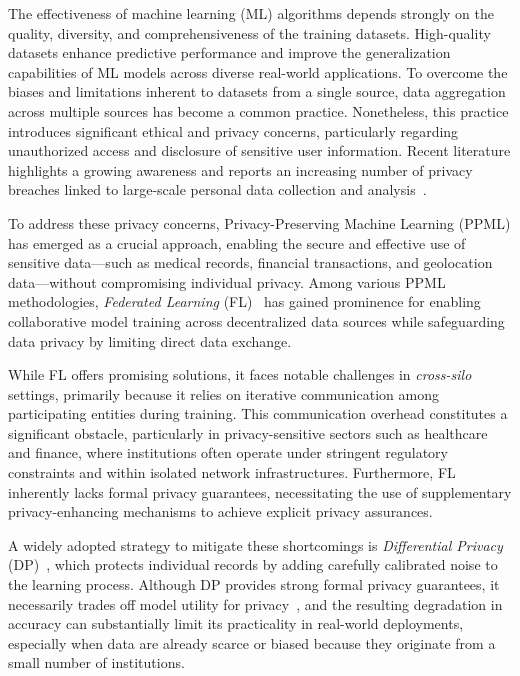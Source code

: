 \documentclass[final,3p,times]{elsarticle}
\theoremstyle{plain}
\begin{document}
The effectiveness of machine learning (ML) algorithms depends strongly on the quality, diversity, and comprehensiveness of the training datasets. High-quality datasets enhance predictive performance and improve the generalization capabilities of ML models across diverse real-world applications. To overcome the biases and limitations inherent to datasets from a single source, data aggregation across multiple sources has become a common practice. Nonetheless, this practice introduces significant ethical and privacy concerns, particularly regarding unauthorized access and disclosure of sensitive user information. Recent literature highlights a growing awareness and reports an increasing number of privacy breaches linked to large-scale personal data collection and analysis~\cite{DataBreaching}.

To address these privacy concerns, Privacy-Preserving Machine Learning (PPML) has emerged as a crucial approach, enabling the secure and effective use of sensitive data—such as medical records, financial transactions, and geolocation data—without compromising individual privacy. Among various PPML methodologies, \textit{Federated Learning} (FL)~\cite{FL1} has gained prominence for enabling collaborative model training across decentralized data sources while safeguarding data privacy by limiting direct data exchange.

While FL offers promising solutions, it faces notable challenges in \textit{cross-silo} settings, primarily because it relies on iterative communication among participating entities during training. This communication overhead constitutes a significant obstacle, particularly in privacy-sensitive sectors such as healthcare and finance, where institutions often operate under stringent regulatory constraints and within isolated network infrastructures. Furthermore, FL inherently lacks formal privacy guarantees, necessitating the use of supplementary privacy-enhancing mechanisms to achieve explicit privacy assurances.

A widely adopted strategy to mitigate these shortcomings is \emph{Differential Privacy} (DP)~\cite{DP,NbaFL}, which protects individual records by adding carefully calibrated noise to the learning process. Although DP provides strong formal privacy guarantees, it necessarily trades off model utility for privacy~\cite{PPML}, and the resulting degradation in accuracy can substantially limit its practicality in real-world deployments, especially when data are already scarce or biased because they originate from a small number of institutions.
\end{document}
